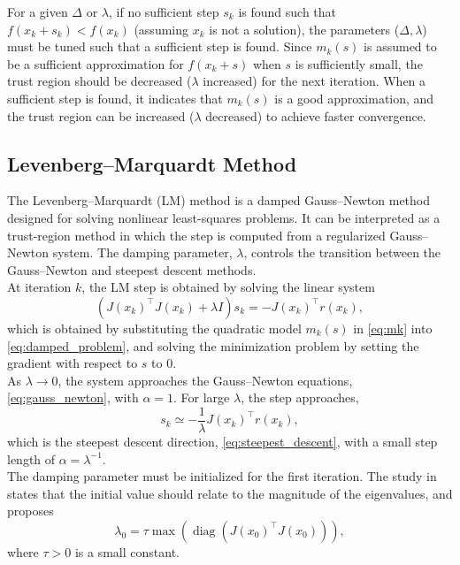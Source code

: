 For a given $\Delta$ or $\lambda$, if no sufficient step $s_k$ is found such that $f(x_k+s_k)<f(x_k)$ (assuming $x_k$ is not a solution), the parameters ($\Delta,\lambda$) must be tuned such that a sufficient step is found. Since $m_k(s)$ is assumed to be a sufficient approximation for $f(x_k+s)$ when $s$ is sufficiently small, the trust region should be decreased ($\lambda$ increased) for the next iteration. When a sufficient step is found, it indicates that $m_k(s)$ is a good approximation, and the trust region can be increased ($\lambda$ decreased) to achieve faster convergence.

\subsection{Levenberg--Marquardt Method} \label{sec:levenberg_marquardt}

The Levenberg--Marquardt (LM) method \cite{madsen2004} is a damped Gauss--Newton method designed for solving nonlinear least-squares problems. It can be interpreted as a trust-region method in which the step is computed from a regularized Gauss--Newton system. The damping parameter, $\lambda$, controls the transition between the Gauss--Newton and steepest descent methods.\\

At iteration $k$, the LM step is obtained by solving the linear system
\begin{equation} \label{eq:lm_system}
    \left( J(x_k)^\top J(x_k) + \lambda I \right) s_k
    =
    - J(x_k)^\top r(x_k),
\end{equation}
which is obtained by substituting the quadratic model $m_k(s)$ in \cref{eq:mk} into \cref{eq:damped_problem}, and solving the minimization problem by setting the gradient with respect to $s$ to 0.\\

As $\lambda \to 0$, the system approaches the Gauss--Newton equations, \cref{eq:gauss_newton}, with $\alpha = 1$. For large $\lambda$, the step approaches,
\begin{equation*}
    s_k \simeq -\frac{1}{\lambda}J(x_k)^\top r(x_k),
\end{equation*}
which is the steepest descent direction, \cref{eq:steepest_descent}, with a small step length of $\alpha=\lambda^{-1}$.\\

The damping parameter must be initialized for the first iteration. The study in \cite{nielsen1999} states that the initial value should relate to the magnitude of the eigenvalues, and proposes
\begin{equation} \label{eq:init_lambda}
\lambda_0 = \tau \max \left( \operatorname{diag}(J(x_0)^\top J(x_0)) \right),
\end{equation}
where $\tau > 0$ is a small constant.\\

